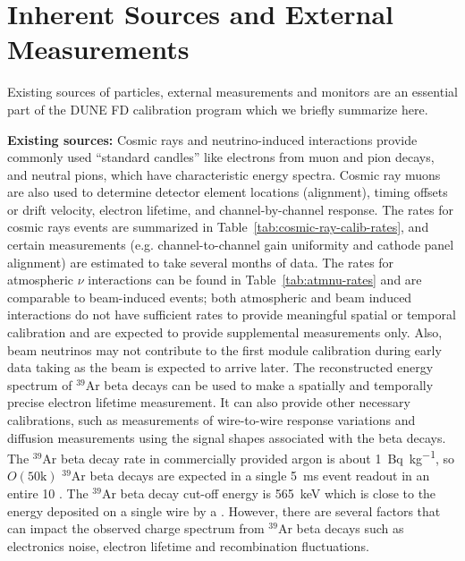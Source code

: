 
\section{Inherent Sources and External Measurements}
\label{sec:exis}

Existing sources of particles, external measurements and monitors are an essential part of the DUNE FD calibration program which we briefly summarize here. 

\textbf{Existing sources:} Cosmic rays and neutrino-induced interactions provide commonly used ``standard candles'' like electrons from muon and pion decays, and neutral pions, which have characteristic energy spectra. Cosmic ray muons are also used to determine detector element locations (alignment), timing offsets or drift velocity, electron lifetime, and channel-by-channel response. The rates for cosmic rays events are summarized in Table~\ref{tab:cosmic-ray-calib-rates}, and certain measurements (e.g. channel-to-channel gain uniformity and cathode panel alignment) are estimated to take several months of data. The rates for atmospheric $\nu$ interactions can be found in Table~\ref{tab:atmnu-rates} and are comparable to beam-induced events; both atmospheric and beam induced interactions do not have sufficient rates to provide meaningful spatial or temporal calibration and are expected to provide supplemental measurements only. Also, beam neutrinos may not contribute to the first module calibration during early data taking as the beam is expected to arrive later. The reconstructed energy spectrum of ${}^{39}$Ar beta decays can be used to make a spatially and temporally precise electron lifetime measurement. It can also provide other necessary calibrations, such as measurements of wire-to-wire response variations and diffusion measurements using the signal shapes associated with the beta decays.
The ${}^{39}$Ar beta decay rate in commercially provided argon is about \SI{1}{\becquerel\per\kilo\gram}, so $O(\mathrm{50k})$ ${}^{39}$Ar beta decays are expected in a single \SI{5}{\milli\s} event readout in an entire \SI{10}{\kt} \detmodule. The ${}^{39}$Ar beta decay cut-off energy is \SI{565}{\keV} which is close to the energy deposited on a single wire by a . However, there are several factors that can impact the observed charge spectrum from ${}^{39}$Ar beta decays such as electronics noise, electron lifetime and recombination fluctuations.%

